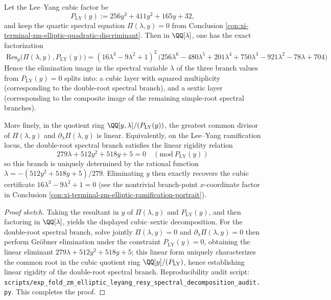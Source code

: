 ﻿\begin{conclusion}\label{con:xi-terminal-zm-leyang-resy-spectral-decomposition}
Let the Lee--Yang cubic factor be
\[
P_{\mathrm{LY}}(y):=256y^{3}+411y^{2}+165y+32,
\]
and keep the quartic spectral equation \(\Pi(\lambda,y)=0\) from Conclusion \ref{con:xi-terminal-zm-elliptic-quadratic-discriminant}.
Then in \(\QQ[\lambda]\), one has the exact factorization
\[
\boxed{\;
\mathrm{Res}_{y}\bigl(\Pi(\lambda,y),P_{\mathrm{LY}}(y)\bigr)
=(16\lambda^{3}-9\lambda^{2}+1)^{2}\,
\bigl(256\lambda^{6}-480\lambda^{5}+201\lambda^{4}+750\lambda^{3}-921\lambda^{2}-78\lambda+704\bigr)\;}
\]
Hence the elimination image in the spectral variable \(\lambda\) of the three branch values from \(P_{\mathrm{LY}}(y)=0\) splits into:
a cubic layer with squared multiplicity (corresponding to the double-root spectral branch), and a sextic layer (corresponding to the composite image of the remaining simple-root spectral branches).
\par
More finely, in the quotient ring \(\QQ[y,\lambda]/(P_{\mathrm{LY}}(y))\), the greatest common divisor of \(\Pi(\lambda,y)\) and \(\partial_{\lambda}\Pi(\lambda,y)\) is linear.
Equivalently, on the Lee--Yang ramification locus, the double-root spectral branch satisfies the linear rigidity relation
\[
\boxed{\;
279\lambda+512y^{2}+518y+5=0\quad(\mathrm{mod}\ P_{\mathrm{LY}}(y))\;}
\]
so this branch is uniquely determined by the rational function \(\lambda=-(512y^{2}+518y+5)/279\).
Eliminating \(y\) then exactly recovers the cubic certificate \(16\lambda^{3}-9\lambda^{2}+1=0\) (see the nontrivial branch-point \(x\)-coordinate factor in Conclusion \ref{con:xi-terminal-zm-elliptic-ramification-portrait}).
\end{conclusion}
\begin{proof}[Proof sketch]
Taking the resultant in \(y\) of \(\Pi(\lambda,y)\) and \(P_{\mathrm{LY}}(y)\), and then factoring in \(\QQ[\lambda]\), yields the displayed cubic--sextic decomposition.
For the double-root spectral branch, solve jointly
\(
\Pi(\lambda,y)=0
\)
and
\(
\partial_{\lambda}\Pi(\lambda,y)=0
\)
then perform Gröbner elimination under the constraint \(P_{\mathrm{LY}}(y)=0\), obtaining the linear eliminant
\(
279\lambda+512y^{2}+518y+5
\);
this linear form uniquely characterizes the common root in the cubic quotient ring \(\QQ[y]/(P_{\mathrm{LY}})\), hence establishing linear rigidity of the double-root spectral branch.
Reproducibility audit script: \texttt{scripts/exp\_fold\_zm\_elliptic\_leyang\_resy\_spectral\_decomposition\_audit.py}. This completes the proof.
\end{proof}

